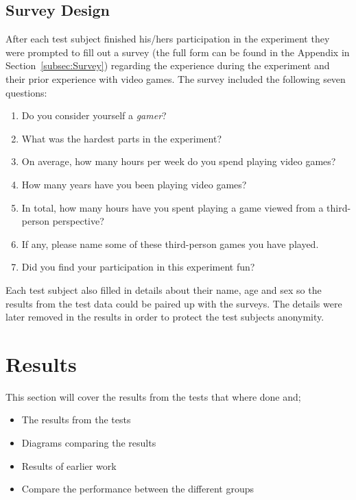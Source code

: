 \documentclass[runningheads,a4paper,oribibl]{llncs}
\begin{document}
\subsection{Survey Design}
After each test subject finished his/hers participation in the experiment they were prompted to fill out a survey (the full form can be found in the Appendix in Section~\ref{subsec:Survey})  regarding the experience during the experiment and their prior experience with video games. The survey included the following seven questions:
\begin{enumerate}
	\item Do you consider yourself a \emph{gamer}?
	\item What was the hardest parts in the experiment?
	\item On average, how many hours per week do you spend playing video games?
	\item How many years have you been playing video games?
	\item In total, how many hours have you spent playing a game viewed from a third-person perspective?
	\item If any, please name some of these third-person games you have played.
	\item Did you find your participation in this experiment fun?
\end{enumerate}
Each test subject also filled in details about their name, age and sex so the results from the test data could be paired up with the surveys. The details were later removed in the results in order to protect the test subjects anonymity.











\section{Results}
This section will cover the results from the tests that where done and;
\begin{itemize}
	\item The results from the tests
	\item Diagrams comparing the results
	\item Results of earlier work
	\item Compare the performance between the different groups
\end{itemize}
\end{document}
